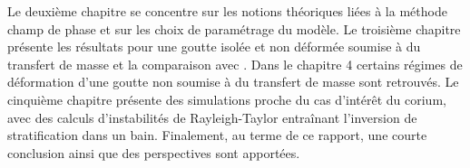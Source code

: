 Le deuxième chapitre se concentre sur les notions théoriques liées à la méthode champ de phase et sur les choix de paramétrage du modèle. Le troisième chapitre présente les résultats pour une goutte isolée et non déformée soumise à du transfert de masse et la comparaison avec \cite{rao_influence_2015}. Dans le chapitre 4 certains régimes de déformation d'une goutte non soumise à du transfert de masse sont retrouvés. Le cinquième chapitre présente des simulations proche du cas d'intérêt du corium, avec des calculs d'instabilités de Rayleigh-Taylor entraînant l'inversion de stratification dans un bain. Finalement, au terme de ce rapport, une courte conclusion ainsi que des perspectives sont apportées.

%
%
